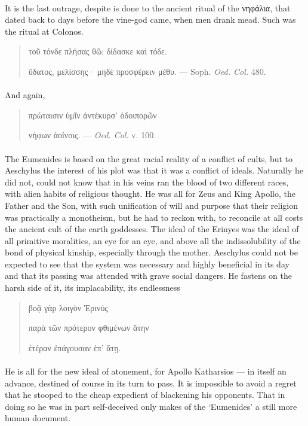 \documentclass[a4paper, 11pt, oneside, polutonikogreek, english]{article}
\begin{document}
\paragraph{}
It is the last outrage, despite is done to the ancient ritual of the νηφάλια, that dated back to days before the vine-god came, when men drank mead. Such was the ritual at Colonos.
\begin{quotation}
τοῦ τόνδε πλήσας θῶ; δίδασκε καὶ τόδε.

ὕδατος, μελίσσης· μηδὲ προσφέρειν μέθυ. --- Soph. \emph{Oed. Col.} 480.
\end{quotation}
\paragraph{}
And again,
\begin{quotation}
πρώταισιν ὑμῖν ἀντέκυρσ' ὁδοιπορῶν

νήφων ἀοίνοις. --- \emph{Oed. Col.} v. 100.
\end{quotation}
\paragraph{}
The Eumenides is based on the great racial reality of a conflict of cults, but to Aeschylus the interest of his plot was that it was a conflict of ideals. Naturally he did not, could not know that in his veins ran the blood of two different races, with alien habits of religious thought. He was all for Zeus and King Apollo, the Father and the Son, with such unification of will and purpose that their religion was practically a monotheism, but he had to reckon with, to reconcile at all costs the ancient cult of the earth goddesses. The ideal of the Erinyes was the ideal of all primitive moralities, an eye for an eye, and above all the indissolubility of the bond of physical kinship, especially through the mother. Aeschylus could not be expected to see that the system was necessary and highly beneficial in its day and that its passing was attended with grave social dangers. He fastens on the harsh side of it, its implacability, its endlessness
\begin{quotation}
\hspace*{15mm}βοᾷ γὰρ λοιγὸν Ἐρινύς

παρὰ τῶν πρότερον φθιμένων ἄτην

ἑτέραν ἐπάγουσαν ἐπ' ἄτῃ.
\end{quotation}
\paragraph{}
He is all for the new ideal of atonement, for Apollo Katharsios --- in itself an advance, destined of course in its turn to pass. It is impossible to avoid a regret that he stooped to the cheap expedient of blackening his opponents. That in doing so he was in part self-deceived only makes of the `Eumenides' a still more human document.
\end{document}

